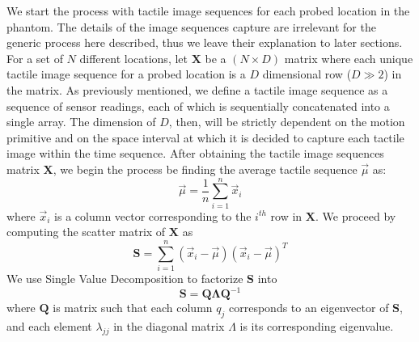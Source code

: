 \documentclass[]{interact}
\theoremstyle{plain}%
\theoremstyle{definition}
\theoremstyle{remark}
\begin{document}
We start the process with tactile image sequences for each probed location in the phantom. The details of the image sequences capture are irrelevant for the generic process here described, thus we leave their explanation to later sections. For a set of $N$ different locations, let $\mathbf{X}$ be a $(N\times D)$ matrix where each unique tactile image sequence for a probed location is a $D$  dimensional row ($D\gg2$) in the matrix. As previously mentioned, we define a tactile image sequence as a sequence of sensor readings, each of which is sequentially concatenated into a single array. The dimension of $D$, then, will be strictly dependent on the motion primitive and on the space interval at which it is decided to capture each tactile image within the time sequence. After obtaining the tactile image sequences matrix $\mathbf{X}$, we begin the process be finding the average tactile sequence $\vec{\mu}$ as:
\begin{equation}
\vec{\mu} = \frac{1}{n}\sum_{i=1}^{n}\vec{x}_i
\end{equation}
where $\vec{x}_i$ is a column vector corresponding to the $i^{th}$ row in $\mathbf{X}$. We proceed by computing the scatter matrix of $\mathbf{X}$ as
\begin{equation}
\mathbf{S} = \sum_{i=1}^{n}(\vec{x}_i-\vec{\mu})(\vec{x}_i-\vec{\mu})^T
\end{equation}
We use Single Value Decomposition to factorize $\mathbf{S}$ into
\begin{equation}
\mathbf{S} = \mathbf{Q}\mathbf{\Lambda} \mathbf{Q}^{-1}
\end{equation}
\noindent where $\mathbf{Q}$ is matrix such that each column $q_j$ corresponds to an eigenvector of $\mathbf{S}$, and each element $\lambda_{jj}$ in the diagonal matrix $\Lambda$ is its corresponding eigenvalue. 
\end{document}
